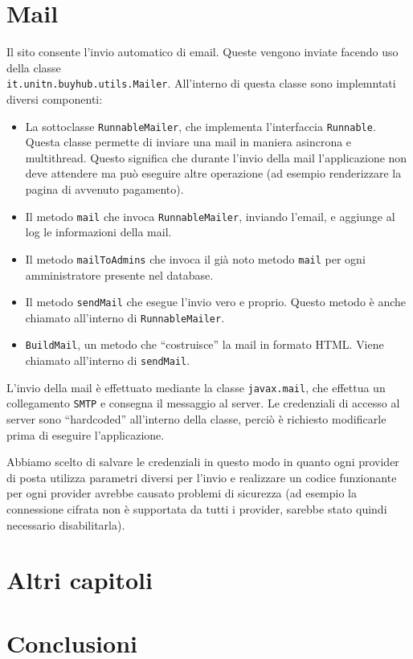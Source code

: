 \chapter{Mail}
Il sito consente l'invio automatico di email. Queste vengono inviate facendo uso della classe \\\texttt{it.unitn.buyhub.utils.Mailer}.
All'interno di questa classe sono implemntati diversi componenti:
\begin{itemize}
  \item La sottoclasse \texttt{RunnableMailer}, che implementa l'interfaccia \texttt{Runnable}. Questa classe permette di inviare una mail in maniera asincrona e multithread. Questo significa che durante l'invio della mail l'applicazione non deve attendere ma può eseguire altre operazione (ad esempio renderizzare la pagina di avvenuto pagamento).
  \item Il metodo \texttt{mail} che invoca \texttt{RunnableMailer}, inviando l'email, e aggiunge al log le informazioni della mail.
  \item Il metodo \texttt{mailToAdmins} che invoca il già noto metodo \texttt{mail} per ogni amministratore presente nel database.
  \item Il metodo \texttt{sendMail} che esegue l'invio vero e proprio. Questo metodo è anche chiamato all'interno di \texttt{RunnableMailer}.
  \item \texttt{BuildMail}, un metodo che ``costruisce'' la mail in formato HTML. Viene chiamato all'interno di \texttt{sendMail}.
\end{itemize}

L'invio della mail è effettuato mediante la classe \texttt{javax.mail}, che effettua un collegamento \texttt{SMTP} e consegna il messaggio al server. Le credenziali di accesso al server sono ``hardcoded'' all'interno della classe, perciò è richiesto modificarle prima di eseguire l'applicazione.

Abbiamo scelto di salvare le credenziali in questo modo in quanto ogni provider di posta utilizza parametri diversi per l'invio e realizzare un codice funzionante per ogni provider avrebbe causato problemi di sicurezza (ad esempio la connessione cifrata non è supportata da tutti i provider, sarebbe stato quindi necessario disabilitarla).




\chapter{Altri capitoli}
\chapter{Conclusioni}

